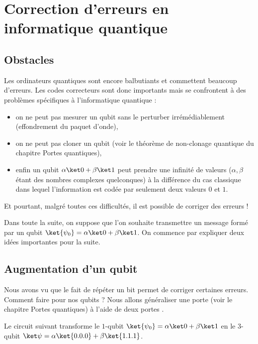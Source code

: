 \documentclass[11pt,class=report,crop=false]{standalone}
\begin{document}
\section{Correction d'erreurs en informatique quantique}

\subsection{Obstacles}

Les ordinateurs quantiques sont encore balbutiants et commettent beaucoup d'erreurs. Les codes correcteurs sont donc importants mais se confrontent à des problèmes spécifiques à l'informatique quantique :
\begin{itemize}
  \item on ne peut pas mesurer un qubit sans le perturber irrémédiablement (effondrement du paquet d'onde),
  \item on ne peut pas cloner un qubit (voir le théorème de non-clonage quantique du chapitre \og{}Portes quantiques\fg{}),
  \item enfin un qubit $\alpha\ket0+\beta\ket1$ peut prendre une infinité de valeurs ($\alpha,\beta$ étant des nombres complexes quelconques) à la différence du cas classique dans lequel l'information est codée par seulement deux valeurs $0$ et $1$.
\end{itemize}

Et pourtant, malgré toutes ces difficultés, il est possible de corriger des erreurs !

Dans toute la suite, on suppose que l'on souhaite transmettre un message formé par un qubit $\ket{\psi_0} = \alpha\ket0+\beta\ket1$.
On commence par expliquer deux idées importantes pour la suite.

\subsection{Augmentation d'un qubit}

Nous avons vu que le fait de répéter un bit permet de corriger certaines erreurs. Comment faire pour 
nos qubits ? 
Nous allons généraliser une porte  (voir le chapitre \og{}Portes quantiques\fg{}) à l'aide de deux portes .

Le circuit suivant transforme le $1$-qubit $\ket{\psi_0} = \alpha\ket0+\beta\ket1$
en le $3$-qubit $\ket\psi = \alpha\ket{0.0.0}+\beta\ket{1.1.1}$.
\end{document}
